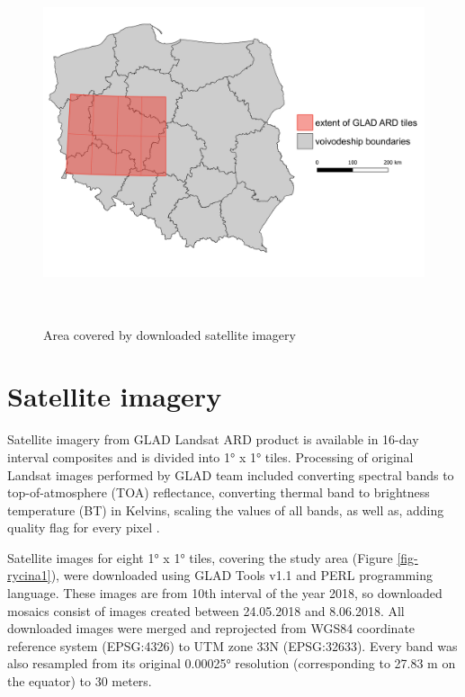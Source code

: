\documentclass{amuthesis}
\begin{document}
\begin{figure}[t]

{\centering \includegraphics[width=5.875in,height=4.16667in]{./figures/study_area.png}

}

\caption{\label{fig-rycina2}Area covered by downloaded satellite
imagery}

\end{figure}

\hypertarget{sec-sat}{%
\section{Satellite imagery}\label{sec-sat}}

Satellite imagery from GLAD Landsat ARD product is available in 16-day
interval composites and is divided into 1° x 1° tiles. Processing of
original Landsat images performed by GLAD team included converting
spectral bands to top-of-atmosphere (TOA) reflectance, converting
thermal band to brightness temperature (BT) in Kelvins, scaling the
values of all bands, as well as, adding quality flag for every pixel
\autocite{potapov_landsat_2020}.

Satellite images for eight 1° x 1° tiles, covering the study area
(Figure \ref{fig-rycina1}), were downloaded using GLAD Tools v1.1 and
PERL programming language. These images are from 10th interval of the
year 2018, so downloaded mosaics consist of images created between
24.05.2018 and 8.06.2018. All downloaded images were merged and
reprojected from WGS84 coordinate reference system (EPSG:4326) to UTM
zone 33N (EPSG:32633). Every band was also resampled from its original
0.00025° resolution (corresponding to 27.83 m on the equator) to 30
meters.
\end{document}
